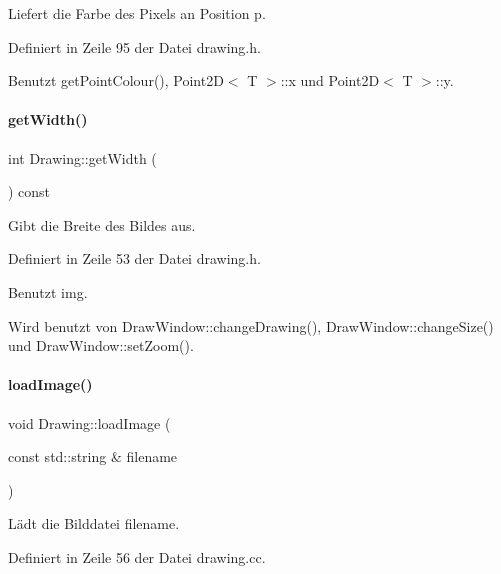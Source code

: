 Liefert die Farbe des Pixels an Position {\ttfamily p}. 



Definiert in Zeile 95 der Datei drawing.\+h.



Benutzt get\+Point\+Colour(), Point2\+D$<$ T $>$\+::x und Point2\+D$<$ T $>$\+::y.

\mbox{\label{classDrawing_ad1272e2a9ec8cd0f69f5c42f9c95c6ce}} 
\paragraph{\texorpdfstring{get\+Width()}{getWidth()}}
{\footnotesize\ttfamily int Drawing\+::get\+Width (\begin{DoxyParamCaption}{ }\end{DoxyParamCaption}) const\hspace{0.3cm}{\ttfamily [inline]}}



Gibt die Breite des Bildes aus. 



Definiert in Zeile 53 der Datei drawing.\+h.



Benutzt img.



Wird benutzt von Draw\+Window\+::change\+Drawing(), Draw\+Window\+::change\+Size() und Draw\+Window\+::set\+Zoom().

\mbox{\label{classDrawing_add2536b3ea8de4f033cb53f0d66192b1}} 
\paragraph{\texorpdfstring{load\+Image()}{loadImage()}}
{\footnotesize\ttfamily void Drawing\+::load\+Image (\begin{DoxyParamCaption}\item[{const std\+::string \&}]{filename }\end{DoxyParamCaption})}



Lädt die Bilddatei {\ttfamily filename}. 



Definiert in Zeile 56 der Datei drawing.\+cc.



